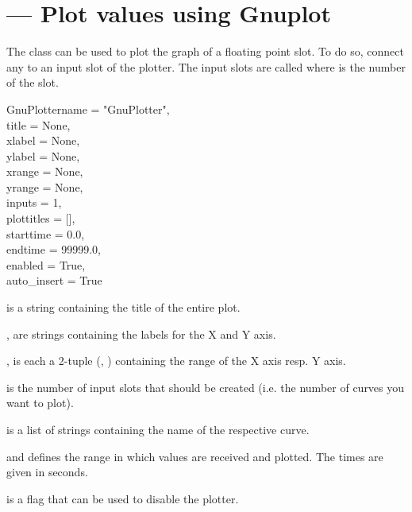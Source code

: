 
\section{ ---
         Plot values using Gnuplot}

The  class can be used to plot the graph of a
floating point slot. To do so, connect any  to
an input slot of the plotter. The input slots are called 
where  is the number of the slot.

\begin{classdesc}{GnuPlotter}{name = "GnuPlotter",\\ 
                              title = None, \\
                              xlabel = None, \\
                              ylabel = None, \\
                              xrange = None, \\
                              yrange = None, \\
                              inputs = 1, \\
                              plottitles = [], \\
                              starttime = 0.0, \\
                              endtime = 99999.0, \\
                              enabled = True, \\
                              auto_insert = True}

 is a string containing the title of the entire plot.

,  are strings containing the labels for the X and
Y axis.

,  is each a 2-tuple (, ) 
containing the range of the X axis resp. Y axis.

 is the number of input slots that should be created (i.e.
the number of curves you want to plot).

 is a list of strings containing the name of the respective
curve.

 and  defines the range in which values are
received and plotted. The times are given in seconds.

 is a flag that can be used to disable the plotter.
\end{classdesc}


